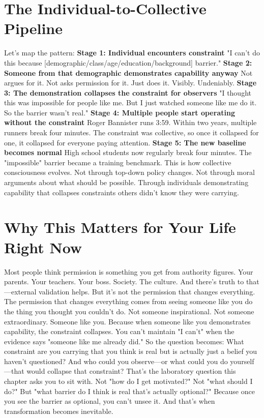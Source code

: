 \documentclass[12pt,openany]{book}
\begin{document}
\section{The Individual-to-Collective Pipeline}

Let's map the pattern:
\textbf{Stage 1: Individual encounters constraint}
"I can't do this because [demographic/class/age/education/background] barrier."
\textbf{Stage 2: Someone from that demographic demonstrates capability anyway}
Not argues for it. Not asks permission for it. Just does it. Visibly. Undeniably.
\textbf{Stage 3: The demonstration collapses the constraint for observers}
"I thought this was impossible for people like me. But I just watched someone like me do it. So the barrier wasn't real."
\textbf{Stage 4: Multiple people start operating without the constraint}
Roger Bannister runs 3:59. Within two years, multiple runners break four minutes. The constraint was collective, so once it collapsed for one, it collapsed for everyone paying attention.
\textbf{Stage 5: The new baseline becomes normal}
High school students now regularly break four minutes. The "impossible" barrier became a training benchmark.
This is how collective consciousness evolves.
Not through top-down policy changes. Not through moral arguments about what should be possible.
Through individuals demonstrating capability that collapses constraints others didn't know they were carrying.

\section{Why This Matters for Your Life Right Now}

Most people think permission is something you get from authority figures.
Your parents. Your teachers. Your boss. Society. The culture.
And there's truth to that—external validation helps. But it's not the permission that changes everything.
The permission that changes everything comes from seeing someone like you do the thing you thought you couldn't do.
Not someone inspirational. Not someone extraordinary. Someone like you.
Because when someone like you demonstrates capability, the constraint collapses. You can't maintain "I can't" when the evidence says "someone like me already did."
So the question becomes:
What constraint are you carrying that you think is real but is actually just a belief you haven't questioned?
And who could you observe—or what could you do yourself—that would collapse that constraint?
That's the laboratory question this chapter asks you to sit with.
Not "how do I get motivated?" Not "what should I do?" But "what barrier do I think is real that's actually optional?"
Because once you see the barrier as optional, you can't unsee it. And that's when transformation becomes inevitable.
\end{document}
